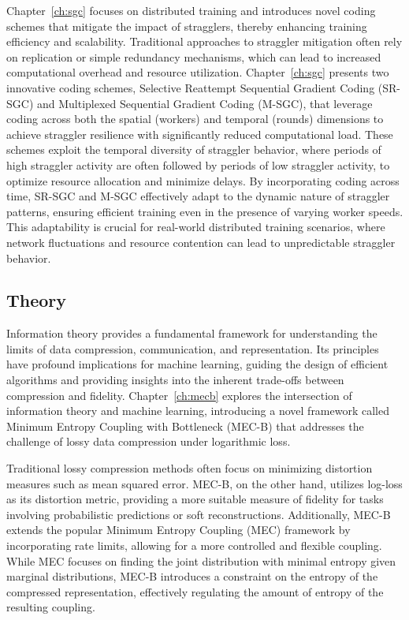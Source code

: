 Chapter~\ref{ch:sgc} focuses on distributed training and introduces novel coding schemes that mitigate the impact of stragglers, thereby enhancing training efficiency and scalability.
Traditional approaches to straggler mitigation often rely on replication or simple redundancy mechanisms, which can lead to increased computational overhead and resource utilization. Chapter~\ref{ch:sgc} presents two innovative coding schemes, Selective Reattempt Sequential Gradient Coding (SR-SGC) and Multiplexed Sequential Gradient Coding (M-SGC), that leverage coding across both the spatial (workers) and temporal (rounds) dimensions to achieve straggler resilience with significantly reduced computational load. These schemes exploit the temporal diversity of straggler behavior, where periods of high straggler activity are often followed by periods of low straggler activity, to optimize resource allocation and minimize delays.
By incorporating coding across time, SR-SGC and M-SGC effectively adapt to the dynamic nature of straggler patterns, ensuring efficient training even in the presence of varying worker speeds. This adaptability is crucial for real-world distributed training scenarios, where network fluctuations and resource contention can lead to unpredictable straggler behavior.

\subsection{Theory}

Information theory provides a fundamental framework for understanding the limits of data compression, communication, and representation. Its principles have profound implications for machine learning, guiding the design of efficient algorithms and providing insights into the inherent trade-offs between compression and fidelity. Chapter~\ref{ch:mecb} explores the intersection of information theory and machine learning, introducing a novel framework called Minimum Entropy Coupling with Bottleneck (MEC-B) that addresses the challenge of lossy data compression under logarithmic loss.

Traditional lossy compression methods often focus on minimizing distortion measures such as mean squared error. MEC-B, on the other hand, utilizes log-loss as its distortion metric, providing a more suitable measure of fidelity for tasks involving probabilistic predictions or soft reconstructions. Additionally, MEC-B extends the popular Minimum Entropy Coupling (MEC) framework by incorporating rate limits, allowing for a more controlled and flexible coupling. While MEC focuses on finding the joint distribution with minimal entropy given marginal distributions, MEC-B introduces a constraint on the entropy of the compressed representation, effectively regulating the amount of entropy of the resulting coupling.

